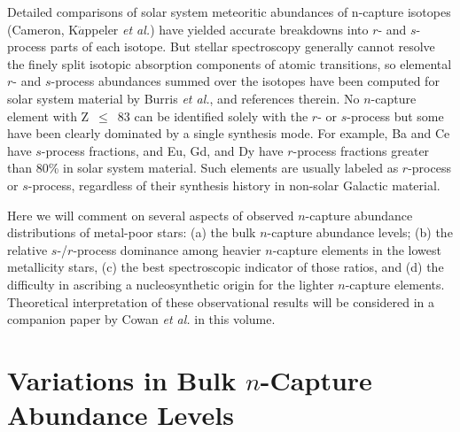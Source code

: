 \documentclass{ws-p8-50x6-00}
\begin{document}
Detailed comparisons of solar system meteoritic abundances of n-capture 
isotopes (Cameron\cite{Ca82}, K$\ddot{a}$ppeler {\it et al.}\cite{Ka89}) 
have yielded 
accurate breakdowns into $r$- and $s$-process parts of each isotope.  
But stellar spectroscopy generally cannot resolve the finely split isotopic
absorption components of atomic transitions, so elemental $r$- and
$s$-process abundances summed over the isotopes have been computed 
for solar system material by Burris {\it et al.}\cite{Bu00},
and references therein.  
No $n$-capture element with Z~$\leq$~83 can be identified solely
with the $r$- or $s$-process but some have been clearly dominated by a 
single synthesis mode.  
For example, Ba and Ce have $s$-process fractions, and Eu, Gd, and Dy have
$r$-process fractions greater than 80\% in solar system material.
Such elements are usually labeled as $r$-process or $s$-process,
regardless of their synthesis history in non-solar Galactic material.
 
Here we will comment on several aspects of observed 
$n$-capture abundance distributions of metal-poor stars: 
(a) the bulk $n$-capture abundance levels; (b) the relative $s$-/$r$-process 
dominance among heavier $n$-capture elements in the lowest metallicity 
stars, (c) the best spectroscopic indicator of those ratios, and (d) the
difficulty in ascribing a nucleosynthetic origin for the lighter 
$n$-capture elements.  
Theoretical interpretation of these observational results will be 
considered in a companion paper by Cowan {\it et al.} in this volume.






\section{Variations in Bulk $n$-Capture Abundance Levels}
\end{document}

